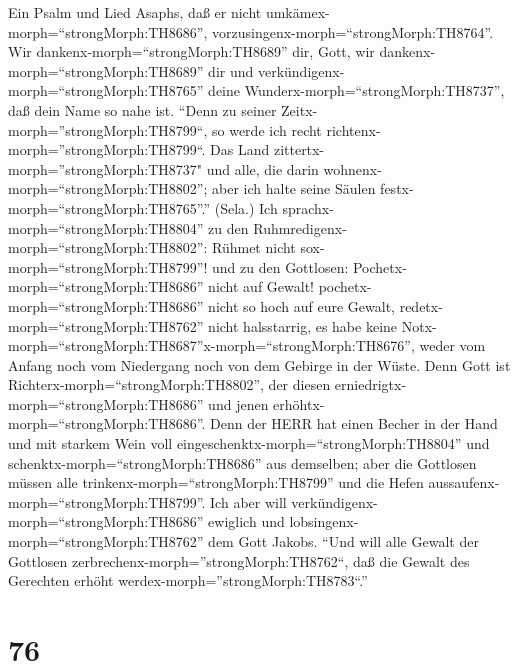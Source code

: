  Ein Psalm und Lied Asaphs, daß er nicht
umkämex-morph=``strongMorph:TH8686'',
vorzusingenx-morph=``strongMorph:TH8764''. Wir
dankenx-morph=``strongMorph:TH8689'' dir, Gott, wir
dankenx-morph=``strongMorph:TH8689'' dir und
verkündigenx-morph=``strongMorph:TH8765'' deine
Wunderx-morph=``strongMorph:TH8737'', daß dein Name so nahe ist.
 ``Denn zu seiner Zeitx-morph=''strongMorph:TH8799``, so
werde ich recht richtenx-morph=''strongMorph:TH8799``.  Das
Land zittertx-morph=''strongMorph:TH8737" und alle, die darin
wohnenx-morph=``strongMorph:TH8802''; aber ich halte seine Säulen
festx-morph=``strongMorph:TH8765''.'' (Sela.)  Ich
sprachx-morph=``strongMorph:TH8804'' zu den
Ruhmredigenx-morph=``strongMorph:TH8802'': Rühmet nicht
sox-morph=``strongMorph:TH8799''! und zu den Gottlosen:
Pochetx-morph=``strongMorph:TH8686'' nicht auf Gewalt! 
pochetx-morph=``strongMorph:TH8686'' nicht so hoch auf eure Gewalt,
redetx-morph=``strongMorph:TH8762'' nicht halsstarrig,  es
habe keine
Notx-morph=``strongMorph:TH8687''\textbar x-morph=``strongMorph:TH8676'',
weder vom Anfang noch vom Niedergang noch von dem Gebirge in der Wüste.
 Denn Gott ist Richterx-morph=``strongMorph:TH8802'', der
diesen erniedrigtx-morph=``strongMorph:TH8686'' und jenen
erhöhtx-morph=``strongMorph:TH8686''.  Denn der HERR hat
einen Becher in der Hand und mit starkem Wein voll
eingeschenktx-morph=``strongMorph:TH8804'' und
schenktx-morph=``strongMorph:TH8686'' aus demselben; aber die Gottlosen
müssen alle trinkenx-morph=``strongMorph:TH8799'' und die Hefen
aussaufenx-morph=``strongMorph:TH8799''.  Ich aber will
verkündigenx-morph=``strongMorph:TH8686'' ewiglich und
lobsingenx-morph=``strongMorph:TH8762'' dem Gott Jakobs. 
``Und will alle Gewalt der Gottlosen
zerbrechenx-morph=''strongMorph:TH8762``, daß die Gewalt des Gerechten
erhöht werdex-morph=''strongMorph:TH8783``.''

\hypertarget{section-75}{%
\section{76}\label{section-75}}

